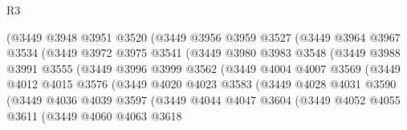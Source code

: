 \begin{lexlean}{R3}
\begin{coremodule}
                      (@3449
                        @3948
                        @3951
                        @3520
                        (@3449
                          @3956
                          @3959
                          @3527
                          (@3449
                            @3964
                            @3967
                            @3534
                            (@3449
                              @3972
                              @3975
                              @3541
                              (@3449
                                @3980
                                @3983
                                @3548
                                (@3449
                                  @3988
                                  @3991
                                  @3555
                                  (@3449
                                    @3996
                                    @3999
                                    @3562
                                    (@3449
                                      @4004
                                      @4007
                                      @3569
                                      (@3449
                                        @4012
                                        @4015
                                        @3576
                                        (@3449
                                          @4020
                                          @4023
                                          @3583
                                          (@3449
                                            @4028
                                            @4031
                                            @3590
                                            (@3449
                                              @4036
                                              @4039
                                              @3597
                                              (@3449
                                                @4044
                                                @4047
                                                @3604
                                                (@3449
                                                  @4052
                                                  @4055
                                                  @3611
                                                  (@3449
                                                    @4060
                                                    @4063
                                                    @3618

\end{coremodule}
\end{lexlean}
